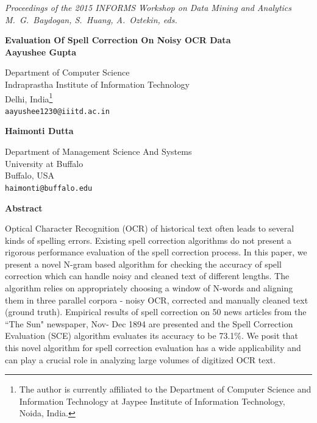 \documentclass[12pt]{article}
\begin{document}
\noindent
\footnotesize{
\noindent
\textit{Proceedings of the 2015 INFORMS Workshop on Data Mining and Analytics\\
\noindent
M.~G.~Baydogan, S.~Huang, A.~Oztekin, eds.}}

\vspace{0.1in}
\begin{center}
    {\large\bf Evaluation Of Spell Correction On Noisy OCR Data}\\
    \vspace{0.3in}
\textbf{Aayushee Gupta}

Department of Computer Science\\
Indraprastha Institute of Information Technology\\
Delhi, India\footnote{The author is currently affiliated to the Department of Computer Science and Information Technology at Jaypee Institute of Information Technology, Noida, India.}\\
\texttt{aayushee1230@iiitd.ac.in}\\
\vspace{0.2in}

\textbf{Haimonti Dutta}

Department of Management Science And Systems\\
University at Buffalo\\
Buffalo, USA\\
\texttt{haimonti@buffalo.edu}\\
\end{center}


\begin{center}
    {\bf Abstract}\\

\end{center}
\noindent
Optical Character Recognition (OCR) of historical text often leads to several kinds of spelling errors. Existing spell correction algorithms do not present a rigorous performance evaluation of the spell correction process. In this paper, we present a novel N-gram based algorithm for checking the accuracy of spell correction which can handle noisy and cleaned text of different lengths. %
The algorithm relies on appropriately choosing a window of N-words and aligning them in three parallel corpora - noisy OCR, corrected and manually cleaned text (ground truth). Empirical results of spell correction on 50 news articles from the ``The Sun" newspaper, Nov- Dec 1894 are presented and the Spell Correction Evaluation (SCE) algorithm evaluates its accuracy to be 73.1\%. We posit that this novel algorithm for spell correction evaluation has a wide applicability and can play a crucial role in analyzing large volumes of digitized OCR text.
\end{document}
